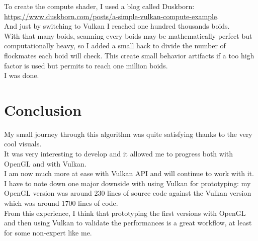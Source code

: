 \documentclass{article}
\begin{document}
To create the compute shader, I used a blog called Duskborn: \url{https://www.duskborn.com/posts/a-simple-vulkan-compute-example}.\\
And just by switching to Vulkan I reached one hundred thousands boids.\\

With that many boids, scanning every boids may be mathematically perfect but computationally heavy, so I added a small hack to divide the number of flockmates each boid will check. This create small behavior artifacts if a too high factor is used but permits to reach one million boids.\\
I was done.

\newpage
\section{Conclusion}
My small journey through this algorithm was quite satisfying thanks to the very cool visuals.\\
It was very interesting to develop and it allowed me to progress both with OpenGL and with Vulkan.\\
I am now much more at ease with Vulkan API and will continue to work with it.\\

I have to note down one major downside with using Vulkan for prototyping: my OpenGL version was around 230 lines of source code against the Vulkan version which was around 1700 lines of code.\\
From this experience, I think that prototyping the first versions with OpenGL and then using Vulkan to validate the performances is a great workflow, at least for some non-expert like me.
\end{document}
